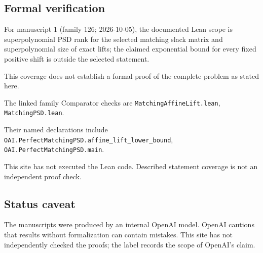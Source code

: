 \documentclass[11pt]{article}
\begin{document}
\subsection{Formal verification}
For manuscript 1 (family 126; 2026-10-05), the documented Lean scope is superpolynomial PSD rank for the selected matching slack matrix and superpolynomial size of exact lifts; the claimed exponential bound for every fixed positive shift is outside the selected statement.

This coverage does not establish a formal proof of the complete problem as stated here.

The linked family Comparator checks are \texttt{MatchingAffineLift.lean}, \texttt{MatchingPSD.lean}.

Their named declarations include \texttt{OAI.PerfectMatchingPSD.affine\_lift\_lower\_bound}, \texttt{OAI.PerfectMatchingPSD.main}.

This site has not executed the Lean code. Described statement coverage is not an independent proof check.

\subsection{Status caveat}
The manuscripts were produced by an internal OpenAI model. OpenAI cautions that results without formalization can contain mistakes. This site has not independently checked the proofs; the label records the scope of OpenAI's claim.
\end{document}

